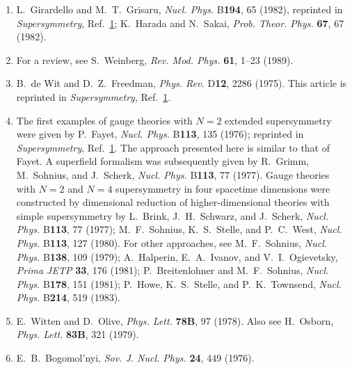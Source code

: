 \begin{enumerate}
  \item {}\label{ch27-ref-9}
  L.~Girardello and M.~T.~Grisaru, \textit{Nucl. Phys.} B\textbf{194},
  65 (1982), reprinted in \textit{Supersymmetry},
  Ref.~\hyperref[ch27-ref-1]{1}; K.~Harada and N.~Sakai,
  \textit{Prob. Theor. Phys.} \textbf{67}, 67 (1982).

  \item {}\label{ch27-ref-10}
  For a review, see S.~Weinberg, \textit{Rev. Mod. Phys.} \textbf{61},
  1--23 (1989).

  \item {}\label{ch27-ref-11}
  B.~de Wit and D.~Z.~Freedman, \textit{Phys. Rev.} D\textbf{12}, 2286
  (1975). This article is reprinted in \textit{Supersymmetry},
  Ref.~\hyperref[ch27-ref-1]{1}.

  \item {}\label{ch27-ref-12}
  The first examples of gauge theories with $N=2$ extended
  supersymmetry were given by P.~Fayet, \textit{Nucl. Phys.}
  B\textbf{113}, 135 (1976); reprinted in \textit{Supersymmetry},
  Ref.~\hyperref[ch27-ref-1]{1}. The approach presented here is similar
  to that of Fayet. A superfield formalism was subsequently given by
  R.~Grimm, M.~Sohnius, and J.~Scherk, \textit{Nucl. Phys.}
  B\textbf{113}, 77 (1977). Gauge theories with $N=2$ and $N=4$
  supersymmetry in four spacetime dimensions were constructed by
  dimensional reduction of higher-dimensional theories with simple
  supersymmetry by L.~Brink, J.~H.~Schwarz, and J.~Scherk,
  \textit{Nucl. Phys.} B\textbf{113}, 77 (1977); M.~F.~Sohnius,
  K.~S.~Stelle, and P.~C.~West, \textit{Nucl. Phys.} B\textbf{113}, 127
  (1980). For other approaches, see M.~F.~Sohnius, \textit{Nucl. Phys.}
  B\textbf{138}, 109 (1979); A.~Halperin, E.~A.~Ivanov, and
  V.~I.~Ogievetsky, \textit{Prima JETP} \textbf{33}, 176 (1981);
  P.~Breitenlohner and M.~F.~Sohnius, \textit{Nucl. Phys.}
  B\textbf{178}, 151 (1981); P.~Howe, K.~S.~Stelle, and
  P.~K.~Townsend, \textit{Nucl. Phys.} B\textbf{214}, 519 (1983).

  \item {}\label{ch27-ref-13}
  E.~Witten and D.~Olive, \textit{Phys. Lett.} \textbf{78B}, 97 (1978).
  Also see H.~Osborn, \textit{Phys. Lett.} \textbf{83B}, 321 (1979).

  \item {}\label{ch27-ref-14}
  E.~B.~Bogomol'nyi, \textit{Sov. J. Nucl. Phys.} \textbf{24}, 449
  (1976).


\end{enumerate}
